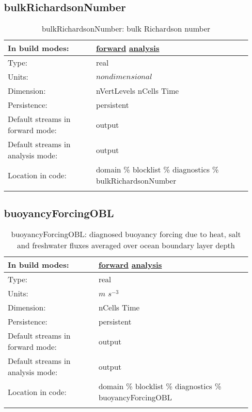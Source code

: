 \subsection[bulkRichardsonNumber]{bulkRichardsonNumber}
\label{subsec:var_sec_diagnostics_bulkRichardsonNumber}
\begin{center}
\begin{longtable}{| p{2.0in} | p{4.0in} |}
        \hline 
        In build modes: & \hyperref[subsec:forward_var_tab_diagnostics]{forward} \hyperref[subsec:analysis_var_tab_diagnostics]{analysis} \\
        \hline 
        Type: & real \\
        \hline 
        Units: & $nondimensional$ \\
        \hline 
        Dimension: & nVertLevels nCells Time \\
        \hline 
        Persistence: & persistent \\
        \hline 
		 Default streams in forward mode: &  output \\
        \hline 
		 Default streams in analysis mode: &  output \\
        \hline 
		 Location in code: & domain \% blocklist \% diagnostics \% bulkRichardsonNumber \\
		 \hline 
    \caption{bulkRichardsonNumber: bulk Richardson number}
\end{longtable}
\end{center}
\subsection[buoyancyForcingOBL]{buoyancyForcingOBL}
\label{subsec:var_sec_diagnostics_buoyancyForcingOBL}
\begin{center}
\begin{longtable}{| p{2.0in} | p{4.0in} |}
        \hline 
        In build modes: & \hyperref[subsec:forward_var_tab_diagnostics]{forward} \hyperref[subsec:analysis_var_tab_diagnostics]{analysis} \\
        \hline 
        Type: & real \\
        \hline 
        Units: & $m$ $s^{-3}$ \\
        \hline 
        Dimension: & nCells Time \\
        \hline 
        Persistence: & persistent \\
        \hline 
		 Default streams in forward mode: &  output \\
        \hline 
		 Default streams in analysis mode: &  output \\
        \hline 
		 Location in code: & domain \% blocklist \% diagnostics \% buoyancyForcingOBL \\
		 \hline 
    \caption{buoyancyForcingOBL: diagnosed buoyancy forcing due to heat, salt and freshwater fluxes averaged over ocean boundary layer depth}
\end{longtable}
\end{center}
